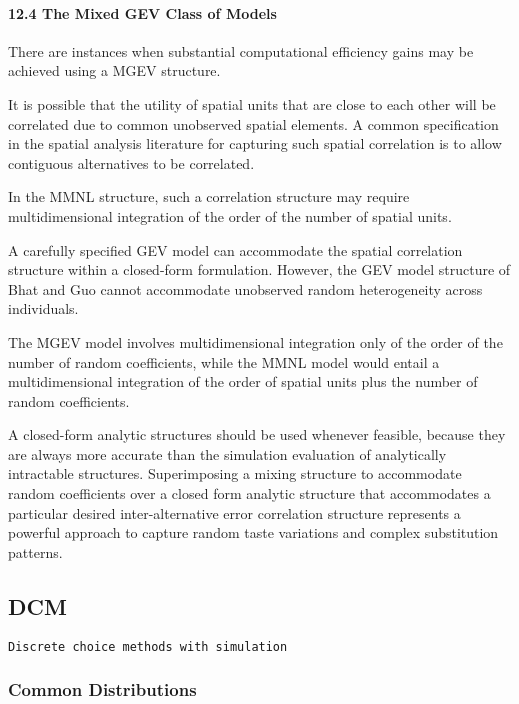 \documentclass[
]{article}
\begin{document}
\hypertarget{the-mixed-gev-class-of-models}{%
\paragraph{12.4 The Mixed GEV Class of
Models}\label{the-mixed-gev-class-of-models}}

There are instances when substantial computational efficiency gains may
be achieved using a MGEV structure.

It is possible that the utility of spatial units that are close to each
other will be correlated due to common unobserved spatial elements. A
common specification in the spatial analysis literature for capturing
such spatial correlation is to allow contiguous alternatives to be
correlated.

In the MMNL structure, such a correlation structure may require
multidimensional integration of the order of the number of spatial
units.

A carefully specified GEV model can accommodate the spatial correlation
structure within a closed-form formulation. However, the GEV model
structure of Bhat and Guo cannot accommodate unobserved random
heterogeneity across individuals.

The MGEV model involves multidimensional integration only of the order
of the number of random coefficients, while the MMNL model would entail
a multidimensional integration of the order of spatial units plus the
number of random coefficients.

A closed-form analytic structures should be used whenever feasible,
because they are always more accurate than the simulation evaluation of
analytically intractable structures. Superimposing a mixing structure to
accommodate random coefficients over a closed form analytic structure
that accommodates a particular desired inter-alternative error
correlation structure represents a powerful approach to capture random
taste variations and complex substitution patterns.

\hypertarget{dcm}{%
\subsection{DCM}\label{dcm}}

\texttt{Discrete\ choice\ methods\ with\ simulation}

\hypertarget{common-distributions}{%
\subsubsection{Common Distributions}\label{common-distributions}}
\end{document}
